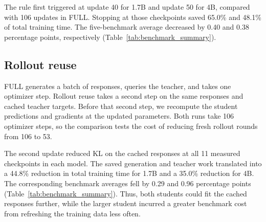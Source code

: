 The rule first triggered at update 40 for 1.7B and update 50 for 4B, compared with 106 updates in FULL. Stopping at those checkpoints saved 65.0\% and 48.1\% of total training time. The five-benchmark average decreased by 0.40 and 0.38 percentage points, respectively (Table~\ref{tab:benchmark_summary}).

\subsection{Rollout reuse}
FULL generates a batch of responses, queries the teacher, and takes one optimizer step. Rollout reuse takes a second step on the same responses and cached teacher targets. Before that second step, we recompute the student predictions and gradients at the updated parameters. Both runs take 106 optimizer steps, so the comparison tests the cost of reducing fresh rollout rounds from 106 to 53.

The second update reduced KL on the cached responses at all 11 measured checkpoints in each model. The saved generation and teacher work translated into a 44.8\% reduction in total training time for 1.7B and a 35.0\% reduction for 4B. The corresponding benchmark averages fell by 0.29 and 0.96 percentage points (Table~\ref{tab:benchmark_summary}). Thus, both students could fit the cached responses further, while the larger student incurred a greater benchmark cost from refreshing the training data less often.

